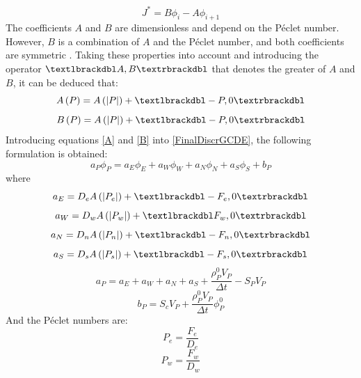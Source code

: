 \begin{equation}
J^{*}=B\phi_{i}-A\phi_{i+1}
\end{equation}
The coefficients $A$ and $B$ are dimensionless and depend on the Péclet number. However, $B$ is a combination of $A$ and the Péclet number, and both coefficients are symmetric \cite{Patankar1980}. Taking these properties into account and introducing the operator $\textlbrackdbl A,B\textrbrackdbl$ that denotes the greater of $A$ and $B$, it can be deduced that:
\begin{equation}
A\left(P\right)=A\left(|P|\right)+\textlbrackdbl-P,0\textrbrackdbl
\label{A}
\end{equation}
\begin{equation}
B\left(P\right)=A\left(|P|\right)+\textlbrackdbl-P,0\textrbrackdbl
\label{B}
\end{equation}
Introducing equations \ref{A} and \ref{B} into \ref{FinalDiscrGCDE}, the following formulation is obtained:
\begin{equation}
a_{P}\phi_{P}=a_{E}\phi_{E}+a_{W}\phi_{W}+a_{N}\phi_{N}+a_{S}\phi_{S}+b_{P}
\label{DiscretizedEquGCDE}
\end{equation}
where
\begin{equation}
a_{E}=D_{e}A\left(|P_{e}|\right)+\textlbrackdbl-F_{e},0\textrbrackdbl
\end{equation}
\begin{equation}
a_{W}=D_{w}A\left(|P_{w}|\right)+\textlbrackdbl F_{w},0\textrbrackdbl
\end{equation}
\begin{equation}
a_{N}=D_{n}A\left(|P_{n}|\right)+\textlbrackdbl-F_{n},0\textrbrackdbl
\end{equation}
\begin{equation}
a_{S}=D_{s}A\left(|P_{s}|\right)+\textlbrackdbl-F_{s},0\textrbrackdbl
\end{equation}
\begin{equation}
a_{P}=a_{E}+a_{W}+a_{N}+a_{S}+\frac{\rho_{P}^{0}V_{P}}{\Delta t}-S_{P}V_{P}
\end{equation}
\begin{equation}
b_{P}=S_{c}V_{P}+\frac{\rho_{P}^{0}V_{P}}{\Delta t}\phi_{P}^{0}
\end{equation}
And the Péclet numbers are:
\begin{equation}
P_{e}=\frac{F_{e}}{D_{e}}
\end{equation}
\begin{equation}
P_{w}=\frac{F_{w}}{D_{w}}
\end{equation}
